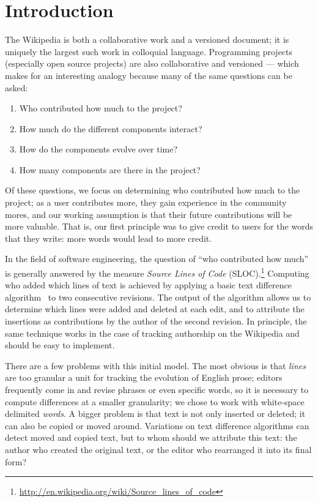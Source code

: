 
\section{Introduction}
\label{sec:diff-intro}

The Wikipedia is both a collaborative work and
a versioned document; it is uniquely the largest such work
in colloquial language.
Programming projects (especially open source projects)
are also collaborative and versioned --- which makes for
an interesting analogy because many of the same questions can be asked:
\begin{enumerate}
\item Who contributed how much to the project?
\item How much do the different components interact?
\item How do the components evolve over time?
\item How many components are there in the project?
\end{enumerate}
Of these questions, we focus on determining who contributed
how much to the project; as a user contributes more, they gain experience
in the community mores, and our working assumption is that their future
contributions will be more valuable.
That is, our first principle was to give credit to users for the words that
they write: more words would lead to more credit.

In the field of software engineering, the question of ``who contributed
how much'' is generally answered by the measure
\textit{Source Lines of Code} (SLOC).\footnote{\url{http://en.wikipedia.org/wiki/Source_lines_of_code}}
Computing who added which lines of text is achieved
by applying a basic text difference
algorithm~\cite{Myers1986,Tichy1984,Burns1997} to two consecutive
revisions.
The output of the algorithm allows us to determine which lines were added and
deleted at each edit, and to attribute the insertions as contributions by the
author of the second revision.
In principle, the same technique works in the case of tracking authorship
on the Wikipedia and should be easy to implement.

There are a few problems with this initial model.
The most obvious is that \textit{lines} are too granular
a unit for tracking the evolution of English prose;
editors frequently come in and revise phrases or
even specific words, so it is necessary to compute
differences at a smaller granularity;
we chose to work with white-space delimited \textit{words}.
A bigger problem is that text is not only inserted
or deleted; it can also be copied or moved around.
Variations on text difference algorithms can
detect moved and copied text, but to whom should we attribute this text:
the author who created the original text, or the editor who rearranged it
into its final form?

